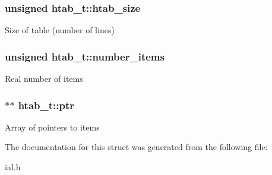 \subsubsection[{htab\+\_\+size}]{\setlength{\rightskip}{0pt plus 5cm}unsigned htab\+\_\+t\+::htab\+\_\+size}\label{structhtab__t_a2565e30da8192e773408aa47e9c69b9c}
Size of table (number of lines) \hypertarget{structhtab__t_a42e08f3235d283aa7a4bd4ce715083f6}{}
\subsubsection[{number\+\_\+items}]{\setlength{\rightskip}{0pt plus 5cm}unsigned htab\+\_\+t\+::number\+\_\+items}\label{structhtab__t_a42e08f3235d283aa7a4bd4ce715083f6}
Real number of items \hypertarget{structhtab__t_a690071ddbcc17c986b7eb600d925a1dd}{}
\subsubsection[{ptr}]{$\ast$$\ast$ htab\+\_\+t\+::ptr}\label{structhtab__t_a690071ddbcc17c986b7eb600d925a1dd}
Array of pointers to items 

The documentation for this struct was generated from the following file\+:\begin{DoxyCompactItemize}
\item 
ial.\+h\end{DoxyCompactItemize}
